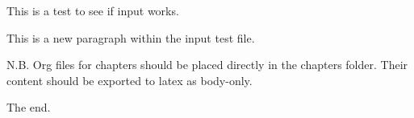 This is a test to see if input works.

This is a new paragraph within the input test file.

N.B. Org files for chapters should be placed directly in the chapters folder.
Their content should be exported to latex as body-only.

The end.
